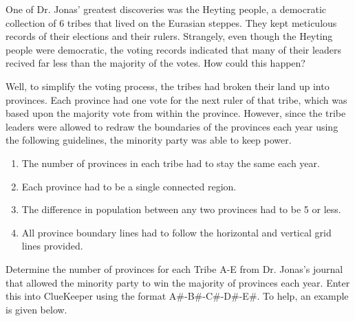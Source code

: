 One of Dr. Jonas' greatest discoveries was the Heyting people, a democratic collection of 6 tribes that lived on the Eurasian steppes.
They kept meticulous records of their elections and their rulers.
Strangely, even though the Heyting people were democratic, the voting records indicated that many of their leaders recived far less than the majority of the votes.
How could this happen?

Well, to simplify the voting process, the tribes had broken their land up into provinces.
Each province had one vote for the next ruler of that tribe, which was based upon
the majority vote from within the province.
However, since the tribe leaders were allowed to redraw the boundaries of the provinces 
each year using the following guidelines,
the minority party was able to keep power.
\begin{enumerate}
\item The number of provinces in each tribe had to stay the same each year.
\item Each province had to be a single connected region.
\item The difference in population between any two provinces had to be 5 or less.
\item All province boundary lines had to follow the horizontal and vertical grid lines provided.
\end{enumerate}

Determine the number of provinces for each Tribe A-E from Dr. Jonas's journal that allowed the minority party
to win the majority of provinces each year. Enter this into ClueKeeper using the format A\#-B\#-C\#-D\#-E\#.
To help, an example is given below.

